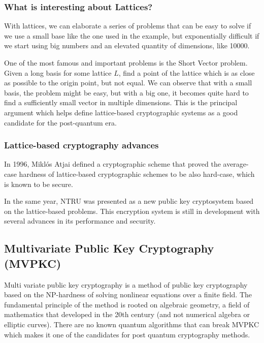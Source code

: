 \subsubsection{What is interesting about Lattices?}

With lattices, we can elaborate a series of problems that can be easy to solve
if we use a small base like the one used in the example, but exponentially
difficult if we start using big numbers and an elevated quantity of dimensions,
like 10000.

One of the most famous and important problems is the Short Vector problem. Given
a long basis for some lattice $L$, find a point of the lattice which is as close
as possible to the origin point, but not equal. We can observe that with a small
basis, the problem might be easy, but with a big one, it becomes quite hard to
find a sufficiently small vector in multiple dimensions. This is the principal
argument which helps define lattice-based cryptographic systems as a good
candidate for the post-quantum era.

\subsubsection{Lattice-based cryptography advances}

In 1996, Miklós Atjai defined a cryptographic scheme that proved the
average-case hardness of lattice-based cryptographic schemes to be also
hard-case, which is known to be secure.

In the same year, NTRU was presented as a new public key cryptosystem based on
the lattice-based problems. This encryption system is still in development with
several advances in its performance and security.



\pagebreak
\subsection{Multivariate Public Key Cryptography (MVPKC)}

Multi variate public key cryptography is a method of public key cryptography
based on the NP-hardness of solving nonlinear equations over a finite field.
The fundamental principle of the method is rooted on algebraic geometry, a field
of mathematics that developed in the 20th century (and not numerical algebra or
elliptic curves). There are no known quantum algorithms that can break MVPKC
which makes it one of the candidates for post quantum cryptography methods.
\cite{ding_multivariate_2009}

